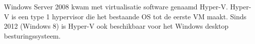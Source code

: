 Windows Server 2008 kwam met virtualisatie software genaamd Hyper-V. Hyper-V is een type 1 hypervisor die het bestaande OS tot de eerste VM maakt. Sinds 2012 (Windows 8) is Hyper-V ook beschikbaar voor het Windows desktop besturingssysteem.


